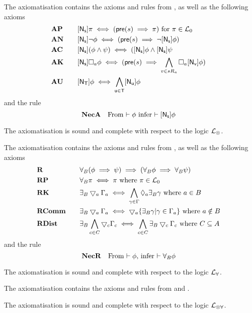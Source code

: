 \begin{defn} \label{axiomAML}
The axiomatisation \AXAML contains the axioms and rules from \AXK, as well as the following axioms
\begin{alignat*}{2}
	& {\bf AP} && \quad [{\mathrm{\mathsf{N}}_\mathrm{\mathsf{s}}}]\pi \iff (\mathrm{\mathsf{pre}}(s) \implies \pi) \text{ for $\pi \in \mathcal{L}_0$}\\
	& {\bf AN} && \quad [{\mathrm{\mathsf{N}}_\mathrm{\mathsf{s}}}] \neg \phi \iff (\mathrm{\mathsf{pre}}(s) \implies \neg [{\mathrm{\mathsf{N}}_\mathrm{\mathsf{s}}}] \phi)\\
	& {\bf AC} && \quad [{\mathrm{\mathsf{N}}_\mathrm{\mathsf{s}}}](\phi \land \psi) \iff ([{\mathrm{\mathsf{N}}_\mathrm{\mathsf{s}}}]\phi \land
			[{\mathrm{\mathsf{N}}_\mathrm{\mathsf{s}}}]\psi\\
	& {\bf AK} && \quad [{\mathrm{\mathsf{N}}_\mathrm{\mathsf{s}}}]\Box_a\phi \iff (\mathrm{\mathsf{pre}}(s) \implies \bigwedge_{v \in s R_a}
		\Box_a [{\mathrm{\mathsf{N}}_\mathrm{\mathsf{v}}}] \phi) \\
	& {\bf AU} && \quad [{\mathrm{\mathsf{N}}_\mathrm{\mathsf{T}}}] \phi \iff \bigwedge_{\mathrm{\mathsf{u}} \in \mathrm{\mathsf{T}}} [{\mathrm{\mathsf{N}}_\mathrm{\mathsf{u}}}] \phi
\end{alignat*}
and the rule
\[
	{\bf NecA} \quad \text{From $\vdash \phi$ infer $\vdash [{\mathrm{\mathsf{N}}_\mathrm{\mathsf{s}}}] \phi$}
\]
\end{defn}

\begin{lemma} \label{axiomAMLSoundComplete}
The axiomatisation \AXAML is sound and complete with respect to the logic $\mathcal{L}_{\otimes}$.
\end{lemma}

\begin{defn} \label{axiomRML}
The axiomatisation \AXRML contains the axioms and rules from \AXK, as well as the following axioms
\begin{alignat*}{2}
	& {\bf R} && \quad \forall_B (\phi \implies \psi) \implies (\forall_B \phi \implies \forall_B \psi) \\
	& {\bf RP} && \quad \forall_B \pi \iff \pi \text{ where } \pi \in \mathcal{L}_0 \\
	& {\bf RK} && \quad\exists_B \bigtriangledown_a \Gamma_a \iff \bigwedge_{\gamma \in \Gamma} \Diamond_a \exists_B
	\gamma \text{ where } a \in B \\
	& {\bf RComm} && \quad \exists_B \bigtriangledown_a \Gamma_a \iff \bigtriangledown_a \{ \exists_B \gamma | \gamma \in
	\Gamma_a\} \text{ where } a \notin B\\
	& {\bf RDist} && \quad \exists_B \bigwedge_{c \in C} \bigtriangledown_c \Gamma_c \iff \bigwedge_{c \in C}
	\exists_B \bigtriangledown_c \Gamma_c \text{ where } C \subseteq A
\end{alignat*}
and the rule
\[
	{\bf NecR} \quad \text{From $\vdash \phi$, infer $\vdash \forall_B \phi$}
\]
\end{defn}

\begin{lemma} \label{axiomRMLSoundComplete}
The axiomatisation \AXRML is sound and complete with respect to the logic $\mathcal{L}_{\forall}$.
\end{lemma}

\begin{defn} \label{axiomAAML}
The axiomatisation \AXAAML contains the axioms and rules from \AXRML and \AXAML.
\end{defn}

\begin{thm} \label{axiomAAMLSoundComplete}
The axiomatisation \AXAAML is sound and complete with respect to the logic $\mathcal{L}_{\otimes\forall}$.
\end{thm}
